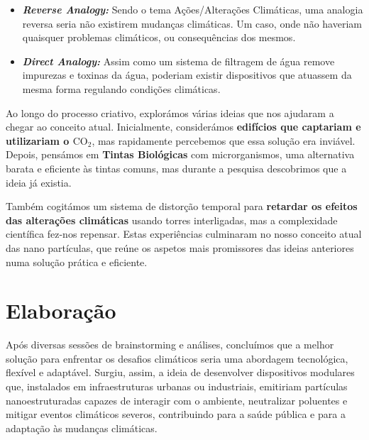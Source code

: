 \documentclass[a4paper, 11pt, onecolumn, oneside]{report}
\newcommand{\coo}{\ensuremath{\mathrm{CO_2}}}
\begin{document}
\begin{itemize}
    \item \textbf{\textit{Reverse Analogy: }} Sendo o tema Ações/Alterações Climáticas, uma analogia reversa seria não existirem mudanças climáticas. Um caso, onde não haveriam quaisquer problemas climáticos, ou consequências dos mesmos.

    \item \textbf{\textit{Direct Analogy: }}Assim como um sistema de filtragem de água remove impurezas e toxinas da água, poderiam existir dispositivos que atuassem da mesma forma regulando condições climáticas.
    
\end{itemize}

Ao longo do processo criativo, explorámos várias ideias que nos ajudaram a chegar ao conceito atual. Inicialmente, considerámos \textbf{edifícios que captariam e utilizariam o \coo}, mas rapidamente percebemos que essa solução era inviável. Depois, pensámos em \textbf{Tintas Biológicas} com microrganismos, uma alternativa barata e eficiente às tintas comuns, mas durante a pesquisa descobrimos que a ideia já existia.
\par
Também cogitámos um sistema de distorção temporal para \textbf{retardar os efeitos das alterações climáticas} usando torres interligadas, mas a complexidade científica fez-nos repensar. Estas experiências culminaram no nosso conceito atual das nano partículas, que reúne os aspetos mais promissores das ideias anteriores numa solução prática e eficiente.

\newpage
\section{Elaboração}
Após diversas sessões de brainstorming e análises, concluímos que a melhor solução para enfrentar os desafios climáticos seria uma abordagem tecnológica, flexível e adaptável. Surgiu, assim, a ideia de desenvolver dispositivos modulares que, instalados em infraestruturas urbanas ou industriais, emitiriam partículas nanoestruturadas capazes de interagir com o ambiente, neutralizar poluentes e mitigar eventos climáticos severos, contribuindo para a saúde pública e para a adaptação às mudanças climáticas.
\end{document}
